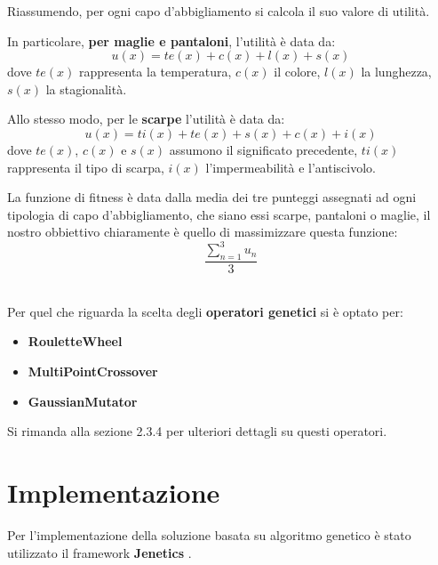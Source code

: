 \documentclass[a4paper, 11pt, oneside]{report}
\begin{document}
            \newpage
            \par \noindent Riassumendo, per ogni capo d'abbigliamento si calcola il suo valore di utilità.
            \\
            \par \noindent In particolare, \textbf{per maglie e pantaloni}, l'utilità è data da:
            \[
                u(x)=te(x)+c(x)+l(x)+s(x)
            \]
            dove $te(x)$ rappresenta la temperatura, $c(x)$ il colore, $l(x)$ la lunghezza, $s(x)$ la stagionalità.
            \\
            \par \noindent Allo stesso modo, per le \textbf{scarpe} l'utilità è data da:
            \[
                u(x)=ti(x)+te(x)+s(x)+c(x)+i(x)
            \]
            dove $te(x)$, $c(x)$ e $s(x)$ assumono il significato precedente, $ti(x)$ rappresenta il tipo di scarpa,
            $i(x)$ l'impermeabilità e l'antiscivolo.
            \\
            \par \noindent La funzione di fitness è data dalla media dei tre punteggi assegnati
            ad ogni tipologia di capo d'abbigliamento, che siano essi scarpe, pantaloni o maglie, il nostro obbiettivo
            chiaramente è quello di massimizzare questa funzione:
            \[
                \frac{\sum_{n=1}^{3} u_{n}}{3}
            \]
            \\
            \par \noindent Per quel che riguarda la scelta degli \textbf{operatori genetici} si è optato per:
            \begin{itemize}
                \item \textbf{RouletteWheel}
                \item \textbf{MultiPointCrossover}
                \item \textbf{GaussianMutator}
            \end{itemize}
            Si rimanda alla sezione 2.3.4 per ulteriori dettagli su questi operatori.

            \newpage
            \section{Implementazione}
            Per l'implementazione della soluzione basata su algoritmo genetico è stato utilizzato il framework
            \textbf{Jenetics} \cite{1}.
\end{document}
